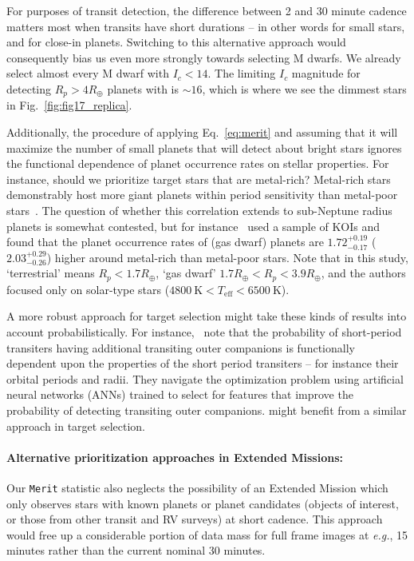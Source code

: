 For purposes of transit detection, the difference between 2 and 30
minute cadence matters most when transits have short durations -- in
other words for small stars, and for close-in planets.  Switching to
this alternative approach would consequently bias us even more
strongly towards selecting M dwarfs.  We already select almost every M
dwarf with $I_c < 14$.  The limiting $I_c$ magnitude for detecting
$R_p > 4R_\oplus$ planets with \tess is $\sim\!16$, which is where we
see the dimmest stars in Fig.~\ref{fig:fig17_replica}.

Additionally, the procedure of applying Eq.~\ref{eq:merit} and
assuming that it will maximize the number of small planets that \tess
will detect about bright stars ignores the functional dependence of
planet occurrence rates on stellar properties.  For instance, should
we prioritize target stars that are metal-rich?  Metal-rich stars
demonstrably host more giant planets within \tesss period sensitivity
than metal-poor
stars~\citep{fischer_planet-metallicity_2005,johnson_giant_2010}.  The
question of whether this correlation extends to sub-Neptune radius
planets is somewhat contested, but for
instance~\citet{wang_revealing_2015} used a sample of KOIs and found
that the planet occurrence rates of (gas dwarf) planets are
$1.72^{+0.19}_{-0.17}$ ($2.03^{+0.29}_{-0.26}$) higher around
metal-rich than metal-poor stars.  Note that in this study,
`terrestrial' means $R_p<1.7R_\oplus$, `gas dwarf' 
$1.7R_\oplus < R_p < 3.9R_\oplus$, and the authors focused only on
solar-type stars ($4800\ \mathrm{K}<T_\mathrm{eff}<6500\ \mathrm{K}$).

A more robust approach for \tesss target selection might take these
kinds of results into account probabilistically.  For
instance,~\protect\citet{kipping_transit_2016} note that the
probability of short-period transiters having additional transiting
outer companions is functionally dependent upon the properties of the
short period transiters -- for instance their orbital periods and
radii.  They navigate the optimization problem using artificial neural
networks (ANNs) trained to select for features that improve the
probability of detecting transiting outer companions.  \tess might
benefit from a similar approach in target selection.

\paragraph{Alternative prioritization approaches in Extended Missions:}
Our \texttt{Merit} statistic also neglects the possibility of an Extended
Mission which only observes stars with known planets or planet
candidates (\tesss objects of interest, or those from other transit
and RV surveys) at short cadence.  This approach would free up a
considerable portion of \tesss data mass for full frame images at
\textit{e.g.}, 15 minutes rather than the current nominal 30 minutes.

